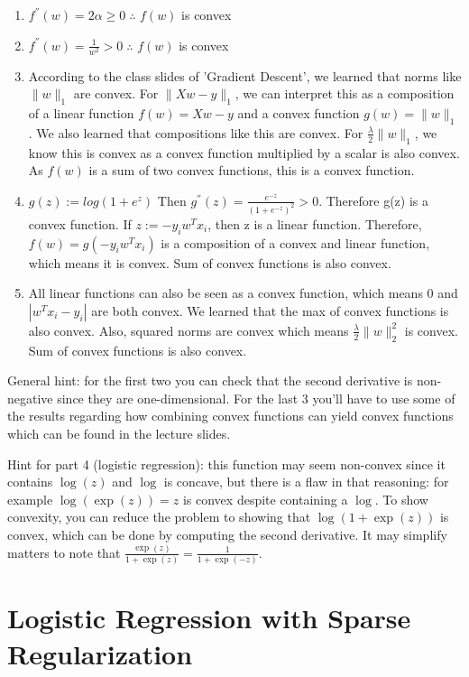\documentclass{article}
\def\red#1{{\color{red}#1}}
\def\norm#1{\|#1\|}
\def\enum#1{\begin{enumerate}#1\end{enumerate}}
\begin{document}
\red{
\enum{
\item $f^{''}(w) = 2\alpha\geq0 \; \therefore$ $f(w)$ is convex
\item $f^{''}(w) = \frac{1}{w^2}>0 \; \therefore$ $f(w)$ is convex
\item According to the class slides of 'Gradient Descent', we learned that norms like $\norm{w}_1$ are convex. For $\norm{Xw-y}_1$, we can interpret this as a composition of a linear function $f(w) = Xw-y$ and a convex function $g(w) = \norm{w}_1$. We also learned that compositions like this are convex. For $\frac{\lambda}{2}\norm{w}_1$, we know this is convex as a convex function multiplied by a scalar is also convex. As $f(w)$ is a sum of two convex functions, this is a convex function.
\item $g(z) := log(1+e^{z})$ Then $g^{''}(z) = \frac{e^{-z}}{(1+e^{-z})^2}>0$. Therefore g(z) is a convex function. If $z := -y_{i}w^{T}x_{i}$, then z is a linear function. Therefore, $f(w) = g(-y_{i}w^{T}x_{i})$ is a composition of a convex and linear function, which means it is convex. Sum of convex functions is also convex.
\item All linear functions can also be seen as a convex function, which means $0$ and $|w^{T}x_{i}-y_{i}|$ are both convex. We learned that the max of convex functions is also convex. Also, squared norms are convex which means $\frac{\lambda}{2}\norm{w}_{2}^{2}$ is convex. Sum of convex functions is also convex.
}
}

General hint: for the first two you can check that the second derivative is non-negative since they are one-dimensional. For the last 3 you'll have to use some of the results regarding how combining convex functions can yield convex functions which can be found in the lecture slides.

Hint for part 4 (logistic regression): this function may seem non-convex since it contains $\log(z)$ and $\log$ is concave, but there is a flaw in that reasoning: for example $\log(\exp(z))=z$ is convex despite containing a $\log$. To show convexity, you can reduce the problem to showing that $\log(1+\exp(z))$ is convex, which can be done by computing the second derivative. It may simplify matters to note that $\frac{\exp(z)}{1+\exp(z)} = \frac{1}{1+\exp(-z)}$.


\section{Logistic Regression with Sparse Regularization}
\end{document}
